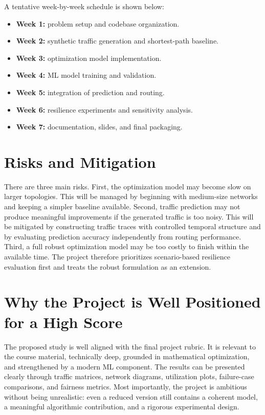 \documentclass[11pt]{article}
\begin{document}
A tentative week-by-week schedule is shown below:
\begin{itemize}
    \item \textbf{Week 1:} problem setup and codebase organization.
    \item \textbf{Week 2:} synthetic traffic generation and shortest-path baseline.
    \item \textbf{Week 3:} optimization model implementation.
    \item \textbf{Week 4:} ML model training and validation.
    \item \textbf{Week 5:} integration of prediction and routing.
    \item \textbf{Week 6:} resilience experiments and sensitivity analysis.
    \item \textbf{Week 7:} documentation, slides, and final packaging.
\end{itemize}

\section{Risks and Mitigation}
There are three main risks. First, the optimization model may become slow on larger topologies. This will be managed by beginning with medium-size networks and keeping a simpler baseline available. Second, traffic prediction may not produce meaningful improvements if the generated traffic is too noisy. This will be mitigated by constructing traffic traces with controlled temporal structure and by evaluating prediction accuracy independently from routing performance. Third, a full robust optimization model may be too costly to finish within the available time. The project therefore prioritizes scenario-based resilience evaluation first and treats the robust formulation as an extension.

\section{Why the Project is Well Positioned for a High Score}
The proposed study is well aligned with the final project rubric. It is relevant to the course material, technically deep, grounded in mathematical optimization, and strengthened by a modern ML component. The results can be presented clearly through traffic matrices, network diagrams, utilization plots, failure-case comparisons, and fairness metrics. Most importantly, the project is ambitious without being unrealistic: even a reduced version still contains a coherent model, a meaningful algorithmic contribution, and a rigorous experimental design.
\end{document}
